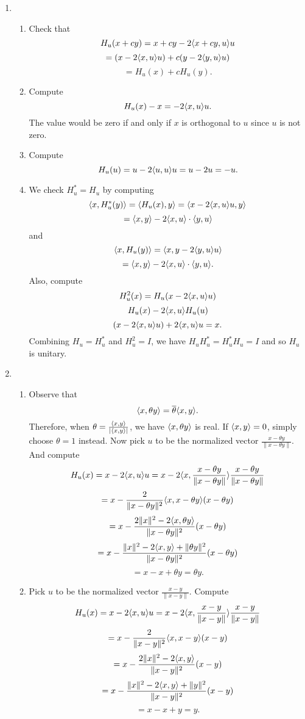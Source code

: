 \begin{enumerate}
\item \begin{enumerate}
\item Check that 
\[H_u(x+cy)=x+cy-2\langle x+cy,u\rangle u\]
\[=(x-2\langle x,u\rangle u)+c(y-2\langle y,u\rangle u)\]
\[=H_u(x)+cH_u(y).\]
\item Compute 
\[H_u(x)-x=-2\langle x,u\rangle u .\]
The value would be zero if and only if $x$ is orthogonal to $u$ since $u$ is not zero.
\item Compute 
\[H_u(u)=u-2\langle u,u\rangle u=u-2u=-u.\]
\item We check $H_u^*=H_u$ by computing 
\[\langle x,H_u^*(y)\rangle =\langle H_u(x),y\rangle =\langle x-2\langle x,u\rangle u,y\rangle \]
\[=\langle x,y\rangle -2\langle x,u\rangle \cdot \langle y,u\rangle \]
and 
\[\langle x,H_u(y)\rangle =\langle x,y-2\langle y,u\rangle u\rangle\]
\[=\langle x,y\rangle -2\langle x,u\rangle \cdot \langle y,u\rangle .\]
Also, compute
\[H_u^2(x)=H_u(x-2\langle x,u\rangle u)\]
\[H_u(x)-2\langle x,u\rangle H_u(u)\]
\[(x-2\langle x,u\rangle u)+2\langle x,u\rangle u=x.\]
Combining $H_u=H_u^*$ and $H_u^2=I$, we have $H_uH_u^*=H_u^*H_u=I$ and so $H_u$ is unitary.
\end{enumerate}
\item \begin{enumerate}
\item Observe that  
\[
    \langle x, \theta y\rangle = \overline{\theta}\langle x,y \rangle.
\]
Therefore, when $\theta = \frac{\langle x,y\rangle}{|\langle x,y\rangle|}$, we have $\langle x, \theta y\rangle$ is real. If $\langle x,y\rangle = 0$, simply choose $\theta = 1$ instead.  Now pick $u$ to be the normalized vector $\frac{x-\theta y}{\|x-\theta y\|}$. And compute 
\[H_u(x)=x-2\langle x,u\rangle u=x-2\langle x,\frac{x-\theta y}{\|x-\theta y\|}\rangle \frac{x-\theta y}{\|x-\theta y\|}\]
\[=x-\frac{2}{\|x-\theta y\|^2}\langle x,x-\theta y\rangle (x-\theta y)\]
\[=x-\frac{2\|x\|^2-2\langle x,\theta y\rangle }{\|x-\theta y\|^2}(x-\theta y)\]
\[=x-\frac{\|x\|^2-2\langle x,y\rangle +\|\theta y\|^2}{\|x-\theta y\|^2}(x-\theta y)\]
\[=x-x+\theta y=\theta y.\]
\item Pick $u$ to be the normalized vector $\frac{x-y}{\|x-y\|}$. Compute 
\[H_u(x)=x-2\langle x,u\rangle u=x-2\langle x,\frac{x-y}{\|x-y\|}\rangle \frac{x-y}{\|x-y\|}\]
\[=x-\frac{2}{\|x-y\|^2}\langle x,x-y\rangle (x-y)\]
\[=x-\frac{2\|x\|^2-2\langle x,y\rangle }{\|x-y\|^2}(x-y)\]
\[=x-\frac{\|x\|^2-2\langle x,y\rangle +\|y\|^2}{\|x-y\|^2}(x-y)\]
\[=x-x+y=y.\]
\end{enumerate}
\end{enumerate}
